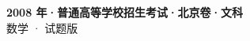 \documentclass[zihao=-4, a4paper]{ctexart}
\begin{document}
\begin{center}
  {\Large\bfseries 2008 年·普通高等学校招生考试·北京卷·文科}\\[4pt]
  {\large 数学 · 试题版}
\end{center}
\medskip
{}

\end{document}
